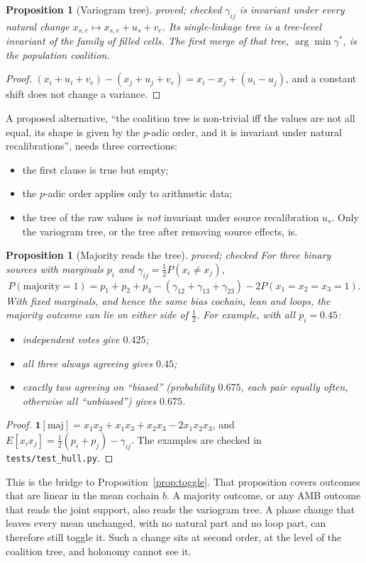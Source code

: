 \documentclass[11pt]{article}
\newtheorem{proposition}[theorem]{Proposition}
\theoremstyle{definition}
\theoremstyle{remark}
\newcommand{\st}[1]{\textsf{\small\color{gray}#1}}
\begin{document}
\begin{proposition}[Variogram tree]\label{prop:variogram}\st{proved; checked}
$\gamma_{ij}$ is invariant under every natural change $x_{s,e}\mapsto x_{s,e}+u_s+v_e$. Its single-linkage tree is a tree-level invariant of the family of filled cells. The first merge of that tree, $\arg\min\gamma^*$, is the population coalition.
\end{proposition}
\begin{proof}
$(x_i+u_i+v_e)-(x_j+u_j+v_e)=x_i-x_j+(u_i-u_j)$, and a constant shift does not change a variance.
\end{proof}
\noindent A proposed alternative, ``the coalition tree is non-trivial iff the values are not all equal, its shape is given by the $p$-adic order, and it is invariant under natural recalibrations'', needs three corrections:
\begin{itemize}
  \item the first clause is true but empty;
  \item the $p$-adic order applies only to arithmetic data;
  \item the tree of the raw values is \emph{not} invariant under source recalibration $u_s$. Only the variogram tree, or the tree after removing source effects, is.
\end{itemize}

\begin{proposition}[Majority reads the tree]\label{prop:majority}\st{proved; checked}
For three binary sources with marginals $p_i$ and $\gamma_{ij}=\tfrac12 P(x_i\ne x_j)$,
\[
P(\text{majority}=1)=p_1+p_2+p_3-(\gamma_{12}+\gamma_{13}+\gamma_{23})-2P(x_1=x_2=x_3=1).
\]
With fixed marginals, and hence the same bias cochain, lean and loops, the majority outcome can lie on either side of $\tfrac12$. For example, with all $p_i=0.45$:
\begin{itemize}
  \item independent votes give $0.425$;
  \item all three always agreeing gives $0.45$;
  \item exactly two agreeing on ``biased'' (probability $0.675$, each pair equally often, otherwise all ``unbiased'') gives $0.675$.
\end{itemize}
\end{proposition}
\begin{proof}
$\mathbf 1[\text{maj}]=x_1x_2+x_1x_3+x_2x_3-2x_1x_2x_3$, and $E[x_ix_j]=\tfrac12(p_i+p_j)-\gamma_{ij}$. The examples are checked in \texttt{tests/test\_hull.py}.
\end{proof}
\noindent This is the bridge to Proposition~\ref{prop:toggle}. That proposition covers outcomes that are linear in the mean cochain $b$. A majority outcome, or any AMB outcome that reads the joint support, also reads the variogram tree. A phase change that leaves every mean unchanged, with no natural part and no loop part, can therefore still toggle it. Such a change sits at second order, at the level of the coalition tree, and holonomy cannot see it.
\end{document}
